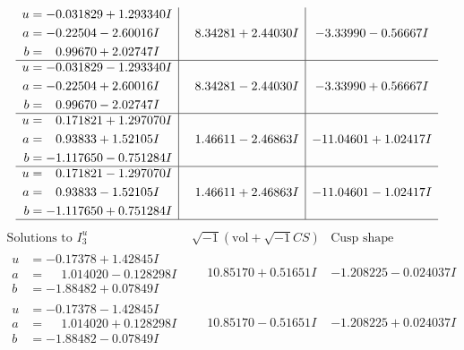 \documentclass[1p]{elsarticle_modified}
\theoremstyle{definition}
\newcommand{\I}{\sqrt{-1}}
\begin{document}
$$\begin{array}{c|c|c}
\begin{aligned}
u &= -0.031829 + 1.293340 I \\
a &= -0.22504 - 2.60016 I \\
b &= \phantom{-}0.99670 + 2.02747 I\end{aligned}
 & \phantom{-}8.34281 + 2.44030 I & -3.33990 - 0.56667 I \\ \hline\begin{aligned}
u &= -0.031829 - 1.293340 I \\
a &= -0.22504 + 2.60016 I \\
b &= \phantom{-}0.99670 - 2.02747 I\end{aligned}
 & \phantom{-}8.34281 - 2.44030 I & -3.33990 + 0.56667 I \\ \hline\begin{aligned}
u &= \phantom{-}0.171821 + 1.297070 I \\
a &= \phantom{-}0.93833 + 1.52105 I \\
b &= -1.117650 - 0.751284 I\end{aligned}
 & \phantom{-}1.46611 - 2.46863 I & -11.04601 + 1.02417 I \\ \hline\begin{aligned}
u &= \phantom{-}0.171821 - 1.297070 I \\
a &= \phantom{-}0.93833 - 1.52105 I \\
b &= -1.117650 + 0.751284 I\end{aligned}
 & \phantom{-}1.46611 + 2.46863 I & -11.04601 - 1.02417 I\\
 \hline 
 \end{array}$$\newpage$$\begin{array}{c|c|c}  
\text{Solutions to }I^u_{3}& \I (\text{vol} + \sqrt{-1}CS) & \text{Cusp shape}\\
 \hline 
\begin{aligned}
u &= -0.17378 + 1.42845 I \\
a &= \phantom{-}1.014020 - 0.128298 I \\
b &= -1.88482 + 0.07849 I\end{aligned}
 & \phantom{-}10.85170 + 0.51651 I & -1.208225 - 0.024037 I \\ \hline\begin{aligned}
u &= -0.17378 - 1.42845 I \\
a &= \phantom{-}1.014020 + 0.128298 I \\
b &= -1.88482 - 0.07849 I\end{aligned}
 & \phantom{-}10.85170 - 0.51651 I & -1.208225 + 0.024037 I \\ \hline\begin{aligned}

\end{aligned}
\end{array}$$
\end{document}
